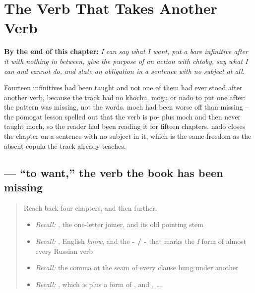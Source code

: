 
\chapter{The Verb That Takes Another Verb}
\label{ch:ru-want-can-must}

\begin{chapteropening}
\textbf{By the end of this chapter:} \emph{I can say what I want, put a bare infinitive after it with nothing in between, give the purpose of an action with chtoby, say what I can and cannot do, and state an obligation in a sentence with no subject at all.}

Fourteen infinitives had been taught and not one of them had ever stood after another verb, because the track had no khochu, mogu or nado to put one after: the pattern was missing, not the words. moch had been worse off than missing -- the pomogat lesson spelled out that the verb is po- plus moch and then never taught moch, so the reader had been reading it for fifteen chapters. nado closes the chapter on a sentence with no subject in it, which is the same freedom as the absent copula the track already teaches.
\end{chapteropening}

\section[\texorpdfstring{\ru{хотеть} (khatét)}{хотеть (khatét)}]{ — \textquotedblleft{}to want,\textquotedblright{} the verb the book has been missing}

\label{lesson:RU-C20-khotet}



\begin{quote}
Reach back four chapters, and then further.

\begin{itemize}
\raggedright
  \item \emph{Recall:} \emph{}, the one-letter joiner, and its old pointing stem
  \item \emph{Recall:} \emph{}, English \emph{know}, and the \textbf{- / -} that marks the \emph{I} form of almost every Russian verb
  \item \emph{Recall:} the comma at the seam of every clause hung under another
  \item \emph{Recall:} \emph{}, which is \textbf{} plus a form of \textbf{}, and \emph{ ,  …}
\end{itemize}
\end{quote}

